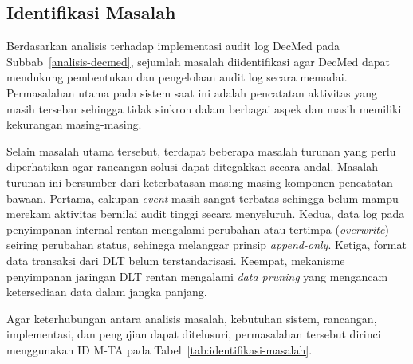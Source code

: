 
\subsection{Identifikasi Masalah}

Berdasarkan analisis terhadap implementasi audit log DecMed pada Subbab~\ref{analisis-decmed}, sejumlah masalah diidentifikasi agar DecMed dapat mendukung pembentukan dan pengelolaan audit log secara memadai. Permasalahan utama pada sistem saat ini adalah pencatatan aktivitas yang masih tersebar sehingga tidak sinkron dalam berbagai aspek dan masih memiliki kekurangan masing-masing.

Selain masalah utama tersebut, terdapat beberapa masalah turunan yang perlu diperhatikan agar rancangan solusi dapat ditegakkan secara andal. Masalah turunan ini bersumber dari keterbatasan masing-masing komponen pencatatan bawaan. Pertama, cakupan \textit{event} masih sangat terbatas sehingga belum mampu merekam aktivitas bernilai audit tinggi secara menyeluruh. Kedua, data log pada penyimpanan internal rentan mengalami perubahan atau tertimpa (\textit{overwrite}) seiring perubahan status, sehingga melanggar prinsip \textit{append-only}. Ketiga, format data transaksi dari DLT belum terstandarisasi. Keempat, mekanisme penyimpanan jaringan DLT rentan mengalami \textit{data pruning} yang mengancam ketersediaan data dalam jangka panjang.

Agar keterhubungan antara analisis masalah, kebutuhan sistem, rancangan, implementasi, dan pengujian dapat ditelusuri, permasalahan tersebut dirinci menggunakan ID M-TA pada Tabel~\ref{tab:identifikasi-masalah}.

